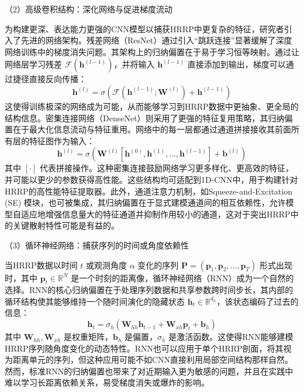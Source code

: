 （2）高级卷积结构：深化网络与促进梯度流动

为构建更深、表达能力更强的CNN模型以捕获HRRP中更复杂的特征，研究者引入了先进的网络架构。残差网络（ResNet）通过引入“跳跃连接”显著缓解了深度网络训练中的梯度消失问题。其架构上的归纳偏置在于易于学习恒等映射。通过让网络层学习残差 $\mathcal{F}(\mathbf{h}^{(l-1)})$，并将输入 $\mathbf{h}^{(l-1)}$ 直接添加到输出，梯度可以通过捷径直接反向传播：
\begin{equation}
    \mathbf{h}^{(l)} = \sigma(\mathcal{F}(\mathbf{h}^{(l-1)}; \mathbf{W}^{(l)}) + \mathbf{h}^{(l-1)})
    \label{eq:resnet_block_revised}
\end{equation}
这使得训练极深的网络成为可能，从而能够学习到HRRP数据中更抽象、更全局的结构信息。密集连接网络（DenseNet）则采用了更强的特征复用策略，其归纳偏置在于最大化信息流动与特征重用。网络中的每一层都通过通道拼接接收其前面所有层的特征图作为输入：
\begin{equation}
    \mathbf{h}^{(l)} = \sigma(\mathbf{W}^{(l)} [\mathbf{h}^{(0)}, \mathbf{h}^{(1)}, \dots, \mathbf{h}^{(l-1)}] + \mathbf{b}^{(l)})
    \label{eq:densenet_block_revised}
\end{equation}
其中 $[\cdot]$ 代表拼接操作。这种密集连接鼓励网络学习更多样化、更高效的特征，并可能以更少的参数获得高性能。这些结构均可适配到1D-CNN中，用于构建针对HRRP的高性能特征提取器。此外，通道注意力机制，如Squeeze-and-Excitation (SE) 模块，也可被集成，其归纳偏置在于显式建模通道间的相互依赖性，允许模型自适应地增强信息量大的特征通道并抑制作用较小的通道，这对于突出HRRP中的关键散射特性可能是有益的。

（3）循环神经网络：捕获序列的时间或角度依赖性

当HRRP数据以时间 $t$ 或观测角度 $\alpha$ 变化的序列 $\mathbf{P} = (\mathbf{p}_1, \mathbf{p}_2, \dots, \mathbf{p}_T)$ 形式出现时，其中 $\mathbf{p}_t \in \mathbb{R}^N$ 是一个时刻的距离像，循环神经网络（RNN）成为一个自然的选择。RNN的核心归纳偏置在于处理序列数据和共享参数跨时间步长，其内部的循环结构使其能够维持一个随时间演化的隐藏状态 $\mathbf{h}_t \in \mathbb{R}^{d_h}$，该状态编码了过去的信息：
\begin{equation}
    \mathbf{h}_t = \sigma_h(\mathbf{W}_{hh} \mathbf{h}_{t-1} + \mathbf{W}_{xh} \mathbf{p}_t + \mathbf{b}_h)
    \label{eq:rnn_recurrence_dim_revised}
\end{equation}
其中 $\mathbf{W}_{hh}, \mathbf{W}_{xh}$ 是权重矩阵，$\mathbf{b}_h$ 是偏置，$\sigma_h$ 是激活函数。这使得RNN能够建模HRRP序列随角度变化的动态特性。RNN也可以应用于单个HRRP剖面，将其视为距离单元的序列，但这种应用可能不如CNN直接利用局部空间结构那样自然。然而，标准RNN的归纳偏置也带来了对近期输入更为敏感的问题，并且在实践中难以学习长距离依赖关系，易受梯度消失或爆炸的影响。

